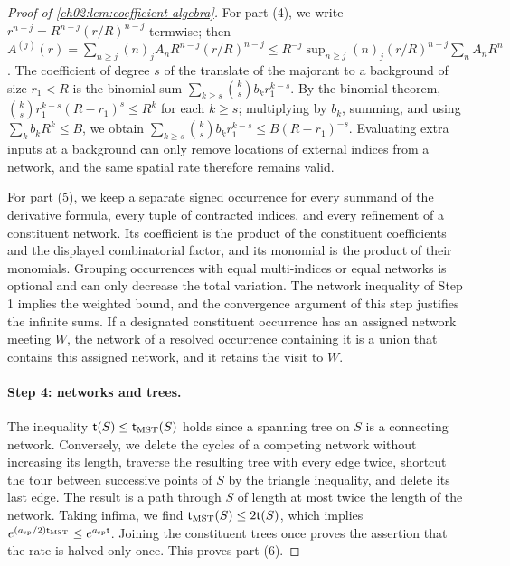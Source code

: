 \begin{proof}[Proof of \cref{ch02:lem:coefficient-algebra}]
For part (4), we write $r^{n-j}=R^{n-j}(r/R)^{n-j}$ termwise; then $A^{(j)}(r)=\sum_{n\ge j}(n)_jA_nR^{n-j}(r/R)^{n-j}\le R^{-j}\sup_{n\ge j}(n)_j(r/R)^{n-j}\sum_nA_nR^n$. The coefficient of degree $s$ of the translate of the majorant to a background of size $r_1<R$ is the binomial sum $\sum_{k\ge s}\binom ks b_kr_1^{k-s}$. By the binomial theorem, $\binom ks r_1^{k-s}(R-r_1)^s\le R^k$ for each $k\ge s$; multiplying by $b_k$, summing, and using $\sum_kb_kR^k\le B$, we obtain $\sum_{k\ge s}\binom ks b_kr_1^{k-s}\le B(R-r_1)^{-s}$. Evaluating extra inputs at a background can only remove locations of external indices from a network, and the same spatial rate therefore remains valid.

For part (5), we keep a separate signed occurrence for every summand of the derivative formula, every tuple of contracted indices, and every refinement of a constituent network. Its coefficient is the product of the constituent coefficients and the displayed combinatorial factor, and its monomial is the product of their monomials. Grouping occurrences with equal multi-indices or equal networks is optional and can only decrease the total variation. The network inequality of Step 1 implies the weighted bound, and the convergence argument of this step justifies the infinite sums. If a designated constituent occurrence has an assigned network meeting $W$, the network of a resolved occurrence containing it is a union that contains this assigned network, and it retains the visit to $W$.

\paragraph{Step 4: networks and trees.} The inequality $\mathsf t(S)\le\mathsf t_{\mathrm{MST}}(S)$ holds since a spanning tree on $S$ is a connecting network. Conversely, we delete the cycles of a competing network without increasing its length, traverse the resulting tree with every edge twice, shortcut the tour between successive points of $S$ by the triangle inequality, and delete its last edge. The result is a path through $S$ of length at most twice the length of the network. Taking infima, we find $\mathsf t_{\mathrm{MST}}(S)\le2\mathsf t(S)$, which implies $e^{(a_{\mathrm{sp}}/2)\mathsf t_{\mathrm{MST}}}\le e^{a_{\mathrm{sp}}\mathsf t}$. Joining the constituent trees once proves the assertion that the rate is halved only once. This proves part (6).


\end{proof}
